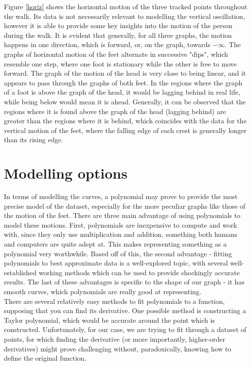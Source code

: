 \documentclass[12pt, a4paper]{article}
\begin{document}
Figure \ref{horiz} shows the horizontal motion of the three tracked points
throughout the walk. Its data is not necessarily relevant to modelling the
vertical oscillation, however it is able to provide some key insights into the
motion of the person during the walk. It is evident that generally, for all
three graphs, the motion happens in one direction, which is forward, or, on the
graph, towards $-\infty$. The graphs of horizontal motion of the feet alternate
in successive "dips", which resemble one step, where one foot is stationary
while the other is free to move forward. The graph of the motion of the head is
very close to being linear, and it appears to pass through the graphs of both
feet. In the regions where the graph of a foot is above the graph of the head,
it would be lagging behind in real life, while being below would mean it is
ahead. Generally, it can be observed that the regions where it is found above
the graph of the head (lagging behind) are greater than the regions where it is
behind, which coincides with the data for the vertical motion of the feet, where
the falling edge of each crest is generally longer than its rising edge.

\section{Modelling options}
In terms of modelling the curves, a polynomial may prove to provide the most
precise model of the dataset, especially for the more peculiar graphs like those
of the motion of the feet. There are three main advantage of using polynomials
to model these motions. First, polynomials are inexpensive to compute and work
with, since they only use multiplication and addition, something both humans and
computers are quite adept at. This makes representing something as a polynomial
very worthwhile. Based off of this, the second advantage - fitting polynomials
to best approximate data is a well-explored topic, with several well-established
working methods which can be used to provide shockingly accurate results. The
last of these advantages is specific to the shape of our graph - it has smooth
curves, which polynomials are really good at representing. \\

There are several relatively easy methods to fit polynomials to a function,
supposing that you can find its derivative. One possible method is constructing
a Taylor polynomial, which would be accurate around the point which is
constructed. Unfortunately, for our case, we are trying to fit through a dataset
of points, for which finding the derivative (or more importantly, higher-order
derivatives) might prove challenging without, paradoxically, knowing how to
define the original function. \\
\end{document}
